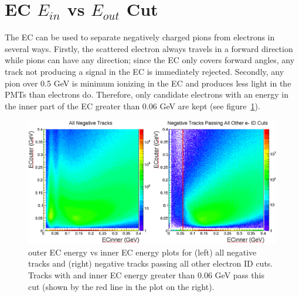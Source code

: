 \section{EC $E_{in}$ vs $E_{out}$ Cut}
\label{sec:ECinvsout}
%
The EC can be used to separate negatively charged pions from electrons in several ways.
Firstly, the scattered electron always travels in a forward direction while pions can have any direction; since the EC only covers forward angles, any track not producing a signal in the EC is immediately rejected.
Secondly, any pion over 0.5 GeV is minimum ionizing in the EC and produces less light in the PMTs than electrons do.
Therefore, only candidate electrons with an energy in the inner part of the EC greater than 0.06 GeV are kept (see figure~\ref{fig:ECoutVinPlot}).
%
\begin{figure}[htp]
\centering
\includegraphics[width=6in]{figures/ECoutVinPlot.png}
\caption{outer EC energy vs inner EC energy plots for (left) all negative tracks and (right) negative tracks passing all other electron ID cuts. Tracks with and inner EC energy greater than 0.06 GeV pass this cut (shown by the red line in the plot on the right).}
\label{fig:ECoutVinPlot}
\end{figure}
%
